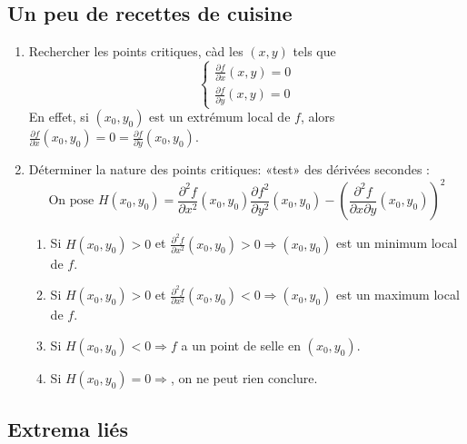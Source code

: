 \subsection{Un peu de recettes de cuisine}

\begin{enumerate}
	\item Rechercher les points critiques, càd les \( (x,y)\) tels que
	      \[  \begin{cases} \frac{\partial f}{\partial x}(x,y) = 0 \\
			      \frac{\partial f}{\partial y}(x,y) = 0
		      \end{cases} \]
	      En effet, si \( (x_0,y_0)\) est un extrémum local de \( f\), alors \( \frac{\partial f}{\partial x}(x_0,y_0) = 0 = \frac{\partial f}{\partial y}(x_0,y_0)\).
	\item Déterminer la nature des points critiques: «test» des dérivées secondes :
	      \[\text{On pose }H(x_0,y_0) = \frac{\partial^2 f}{\partial x^2}(x_0,y_0)\frac{\partial f^2}{\partial y^2}(x_0,y_0) - \left(\frac{\partial^2 f}{\partial x\partial y}(x_0,y_0)\right)^2\]
	      \begin{enumerate}
		      \item Si \( H(x_0,y_0) > 0\) et \( \frac{\partial^2 f}{\partial x^2}(x_0,y_0) > 0 \Longrightarrow (x_0,y_0)\) est un minimum local de \( f\).
		      \item Si \( H(x_0,y_0) > 0\) et \( \frac{\partial^2 f}{\partial x^2}(x_0,y_0) < 0 \Longrightarrow (x_0,y_0)\) est un maximum local de \( f\).
		      \item Si \( H(x_0,y_0) < 0 \Longrightarrow f\) a un point de selle en \( (x_0,y_0)\).
		      \item Si \( H(x_0,y_0) = 0 \Longrightarrow\), on ne peut rien conclure.
	      \end{enumerate}
\end{enumerate}

\subsection{Extrema liés}


